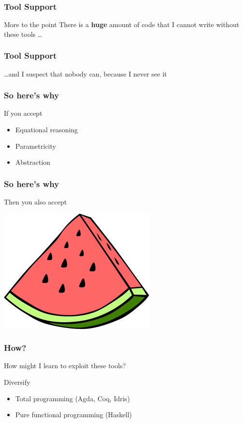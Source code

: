 \begin{frame}
\frametitle{Tool Support}
\begin{block}{More to the point}
There is a \textbf{huge} amount of code that I cannot write without these tools \ldots
\end{block}
\end{frame}


\begin{frame}
\frametitle{Tool Support}
\begin{block}{\ldots and I suspect}
that nobody can, because I never see it
\end{block}
\end{frame}


\begin{frame}
\frametitle{So here's why}
\begin{block}{If you accept}
\begin{itemize}
  \item Equational reasoning
  \item Parametricity
  \item Abstraction
\end{itemize}
\end{block}
\end{frame}


\begin{frame}
\frametitle{So here's why}
\begin{block}{Then you also accept}
\begin{center}
\includegraphics[width=0.3\paperwidth]{image/watermelon.png}
\end{center}
\end{block}
\end{frame}


\begin{frame}
\frametitle{How?}
\begin{block}{How might I learn to exploit these tools?}
\begin{center}
\huge{Diversify}\normalsize
\end{center}
\begin{itemize}
  \item Total programming (Agda, Coq, Idris)
  \item Pure functional programming (Haskell)
\end{itemize}
\end{block}
\end{frame}


